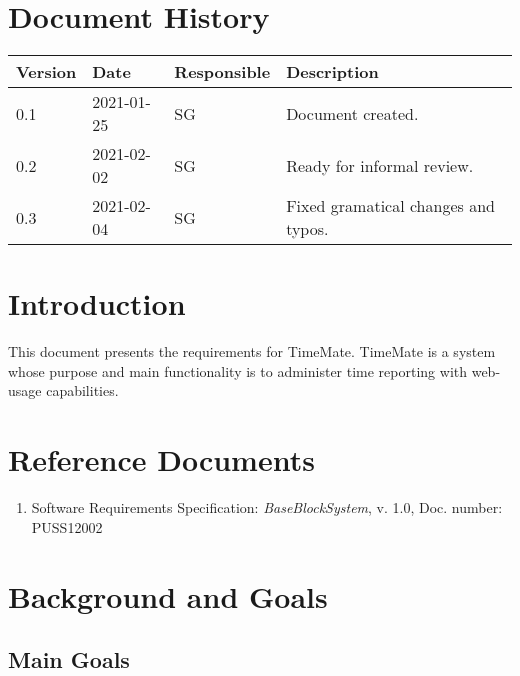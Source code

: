 \documentclass{article}
\date {#1}
\title {
    \documentNumber {01}    
    
    \documentVersion {0.3}
    
    \documentTitle {Software Requirements Specification}
    \documentGroup {2}
    
    \documentResponsible {System Group}
    \documentAuthors {System Group, Development Group}
    
    \documentDate {2021-02-04}
}
\begin{document}
\maketitle
\thispagestyle{empty}

\newpage

\tableofcontents

\newpage

\section{Document History}
\begin{tabular}{ l | l | l | l }
    Version & Date & Responsible & Description \\
    \hline
    0.1 & 2021-01-25 & SG & Document created. \\
    0.2 & 2021-02-02 & SG & Ready for informal review. \\
    0.3 & 2021-02-04 & SG & Fixed gramatical changes and typos. \\
\end{tabular}

\section{Introduction}

This document presents the requirements for TimeMate. TimeMate is a system whose purpose and main functionality is to administer time reporting with web-usage capabilities. 


\section{Reference Documents}

\begin{enumerate}
  \item Software Requirements Specification: \emph{BaseBlockSystem}, v. 1.0, Doc. number: PUSS12002
  
\end{enumerate}

\section{Background and Goals}
\subsection{Main Goals}
\end{document}
